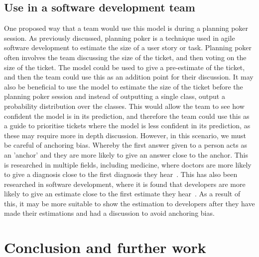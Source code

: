 \documentclass{UoYCSproject}
\begin{document}
    \section{Use in a software development team} \label{sec:use-in-a-software-development-team}
    One proposed way that a team would use this model is during a planning poker session.
    As previously discussed, planning poker is a technique used in agile software development to estimate the size of a user story or task.
Planning poker often involves the team discussing the size of the ticket, and then voting on the size of the ticket.
    The model could be used to give a pre-estimate of the ticket, and then the team could use this as an addition point for their discussion.
It may also be beneficial to use the model to estimate the size of the ticket before the planning poker session and instead of outputting a single class, output a probability distribution over the classes.
    This would allow the team to see how confident the model is in its prediction, and therefore the team could use this as a guide to prioritise tickets where the model is less confident in its prediction, as these may require more in depth discussion.
    However, in this scenario, we must be careful of anchoring bias.
    Whereby the first answer given to a person acts as an 'anchor' and they are more likely to give an answer close to the anchor.
    This is researched in multiple fields, including medicine, where doctors are more likely to give a diagnosis close to the first diagnosis they hear~\cite{biasMedicine}.
This has also been researched in software development, where it is found that developers are more likely to give an estimate close to the first estimate they hear~\cite{softwareBias}.
    As a result of this, it may be more suitable to show the estimation to developers after they have made their estimations and had a discussion to avoid anchoring bias.


    \chapter{Conclusion and further work}
    \label{ch:conclusion}
\end{document}
